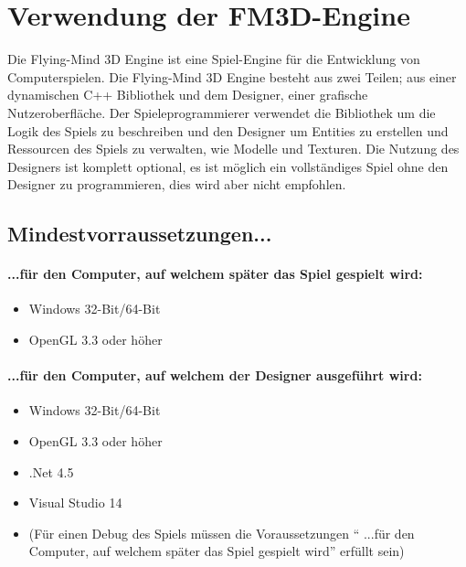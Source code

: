 \chapter[Verwendung]{Verwendung der FM3D-Engine}
Die Flying-Mind 3D Engine ist eine Spiel-Engine für die Entwicklung von Computerspielen. Die Flying-Mind 3D Engine besteht aus zwei Teilen; aus einer dynamischen C++ Bibliothek und dem Designer, einer grafische Nutzeroberfläche. Der Spieleprogrammierer verwendet die Bibliothek um die Logik des Spiels zu beschreiben und den Designer um Entities zu erstellen und Ressourcen des Spiels zu verwalten, wie Modelle und Texturen. Die Nutzung des Designers ist komplett optional, es ist möglich ein vollständiges Spiel ohne den Designer zu programmieren, dies wird aber nicht empfohlen. 

\section{Mindestvorraussetzungen...}
\subsubsection{...für den Computer, auf welchem später das Spiel gespielt wird:}
\begin{itemize}
	\item Windows 32-Bit/64-Bit
	\item OpenGL 3.3 oder höher
\end{itemize}
\subsubsection{...für den Computer, auf welchem der Designer ausgeführt wird:}
\begin{itemize}
	\item Windows 32-Bit/64-Bit
	\item OpenGL 3.3 oder höher
	\item .Net 4.5
	\item Visual Studio 14
	\item (Für einen Debug des Spiels müssen die Voraussetzungen "` ...für den Computer, auf welchem später das Spiel gespielt wird"' erfüllt sein)
\end{itemize}


